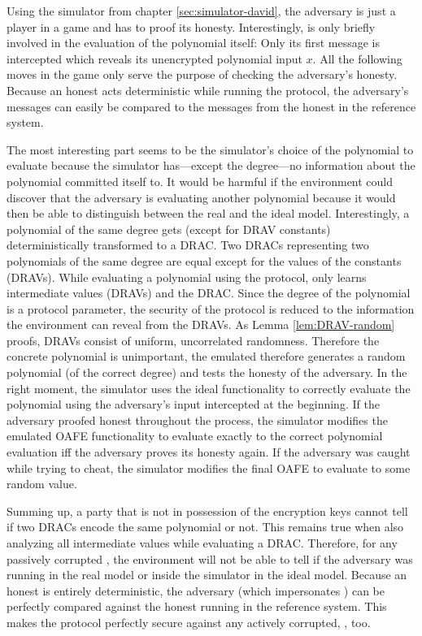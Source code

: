 Using the simulator from chapter \ref{sec:simulator-david}, the adversary
\JWadv{} is just a player in a game and has to proof its honesty. Interestingly,
\JWadv{} is only briefly involved in the evaluation of the polynomial
itself: Only its first message is intercepted which reveals its unencrypted
polynomial input $x$. All the following moves in the game only serve the purpose
of checking the adversary's honesty. Because an honest \JWpTwo{} acts
deterministic while running the protocol, the adversary's messages can easily be
compared to the messages from the honest \JWpTwo{} in the reference system.

The most interesting part seems to be the simulator's choice of the polynomial
to evaluate because the simulator has---except the degree---no information about
the polynomial \JWpOne{} committed itself to. It would be harmful if the
environment could discover that the adversary is evaluating another polynomial
because it would then be able to distinguish between the real and the ideal
model. Interestingly, a polynomial of the same degree gets (except for DRAV
constants) deterministically transformed to a DRAC\@. Two DRACs representing two
polynomials of the same degree are equal except for the values of the constants
(DRAVs).  While evaluating a polynomial using the protocol, \JWpTwo{} only
learns intermediate values (DRAVs) and the DRAC\@. Since the degree of the
polynomial is a protocol parameter, the security of the protocol is reduced to
the information the environment can reveal from the DRAVs. As Lemma
\ref{lem:DRAV-random} proofs, DRAVs consist of uniform, uncorrelated randomness.
Therefore the concrete polynomial is unimportant, the emulated \JWpOne{}
therefore generates a random polynomial (of the correct degree) and tests the
honesty of the adversary. In the right moment, the simulator uses the ideal
functionality \JWfuncSymOPE{} to correctly evaluate the polynomial using the
adversary's input intercepted at the beginning. If the adversary proofed honest
throughout the process, the simulator modifies the emulated OAFE functionality
to evaluate exactly to the correct polynomial evaluation iff the adversary
proves its honesty again. If the adversary was caught while trying to cheat, the
simulator modifies the final OAFE to evaluate to some random value.

Summing up, a party that is not in possession of the encryption keys cannot tell
if two DRACs encode the same polynomial or not. This remains true when also
analyzing all intermediate values while evaluating a DRAC\@. Therefore, for any
passively corrupted \JWadv{}, the environment will not be able to tell if the
adversary \JWadv{} was running in the real model or inside the simulator in the
ideal model. Because an honest \JWpTwo{} is entirely deterministic, the
adversary (which impersonates \JWpTwo{}) can be perfectly compared against the
honest \JWpTwo{} running in the reference system. This makes the protocol
perfectly secure against any actively corrupted, \JWpTwo{}, too.


